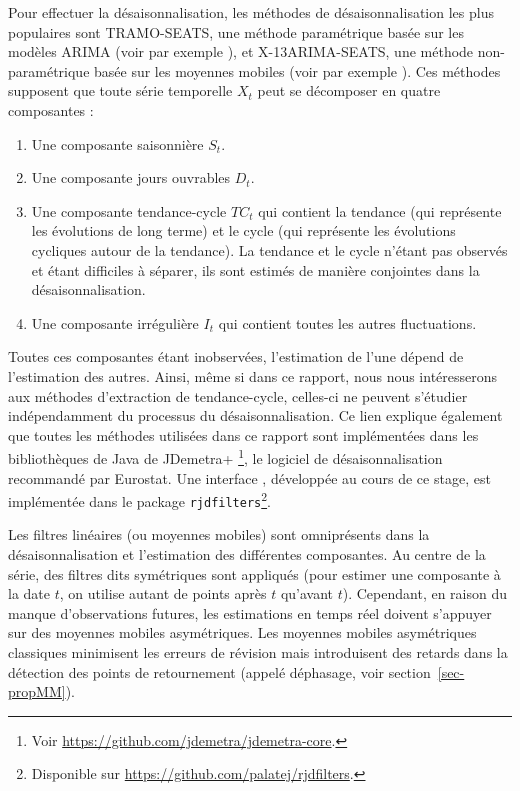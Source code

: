 \documentclass[
  11pt,
  french,
  a4paper]{article}
\newcommand\1{\mathds{1}}
\begin{document}
Pour effectuer la désaisonnalisation, les méthodes de désaisonnalisation les plus populaires sont TRAMO-SEATS, une méthode paramétrique basée sur les modèles ARIMA (voir par exemple \textcite{maravall2004program}), et X-13ARIMA-SEATS, une méthode non-paramétrique basée sur les moyennes mobiles (voir par exemple \textcite{ladiray2011seasonal}).
Ces méthodes supposent que toute série temporelle \(X_t\) peut se décomposer en quatre composantes :

\begin{enumerate}
\def\labelenumi{\arabic{enumi}.}
\item
  Une composante saisonnière \(S_t\).
\item
  Une composante jours ouvrables \(D_t\).
\item
  Une composante tendance-cycle \(TC_t\) qui contient la tendance (qui représente les évolutions de long terme) et le cycle (qui représente les évolutions cycliques autour de la tendance).
  La tendance et le cycle n'étant pas observés et étant difficiles à séparer, ils sont estimés de manière conjointes dans la désaisonnalisation.
\item
  Une composante irrégulière \(I_t\) qui contient toutes les autres fluctuations.
\end{enumerate}

Toutes ces composantes étant inobservées, l'estimation de l'une dépend de l'estimation des autres.
Ainsi, même si dans ce rapport, nous nous intéresserons aux méthodes d'extraction de tendance-cycle, celles-ci ne peuvent s'étudier indépendamment du processus du désaisonnalisation.
Ce lien explique également que toutes les méthodes utilisées dans ce rapport sont implémentées dans les bibliothèques de Java de JDemetra+ \footnote{Voir \url{https://github.com/jdemetra/jdemetra-core}.}, le logiciel de désaisonnalisation recommandé par Eurostat.
Une interface , développée au cours de ce stage, est implémentée dans le package \texttt{rjdfilters}\footnote{Disponible sur \url{https://github.com/palatej/rjdfilters}.}.

Les filtres linéaires (ou moyennes mobiles) sont omniprésents dans la désaisonnalisation et l'estimation des différentes composantes.
Au centre de la série, des filtres dits symétriques sont appliqués (pour estimer une composante à la date \(t\), on utilise autant de points après \(t\) qu'avant \(t\)).
Cependant, en raison du manque d'observations futures, les estimations en temps réel doivent s'appuyer sur des moyennes mobiles asymétriques.
Les moyennes mobiles asymétriques classiques minimisent les erreurs de révision mais introduisent des retards dans la détection des points de retournement (appelé déphasage, voir section~\ref{sec-propMM}).
\end{document}
